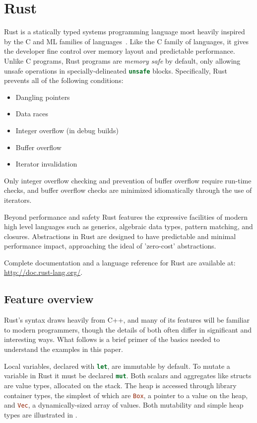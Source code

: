 
\section{Rust}
\label{sec:rust}

Rust is a statically typed systems programming language most heavily inspired by the C
and ML families of languages~\cite{RUST}.
Like the C family of languages, it gives the developer fine control over memory layout
and predictable performance.
Unlike C programs, Rust programs are \emph{memory safe} by default,
only allowing unsafe operations in specially-delineated \lstinline[language=Rust]{unsafe} blocks.
Specifically, Rust prevents all of the following conditions:
\begin{itemize}
\item Dangling pointers
\item Data races
\item Integer overflow (in debug builds)
\item Buffer overflow
\item Iterator invalidation
\end{itemize}
Only integer overflow checking and prevention of buffer overflow require run-time checks, and buffer overflow checks are minimized idiomatically through the use of iterators.

Beyond performance and safety Rust features the expressive facilities
of modern high level languages such as generics, algebraic data types,
pattern matching, and closures.
Abstractions in Rust are designed to have predictable and minimal
performance impact, approaching the ideal of 'zero-cost' abstractions.

Complete documentation and a language reference for Rust are available at: \url{http://doc.rust-lang.org/}.

\subsection{Feature overview}

Rust's syntax draws heavily from C++, and many of its features will be
familiar to modern programmers, though the details of both
often differ in significant and interesting ways.
What follows is a brief primer of the basics needed to understand the examples in this paper.

Local variables, declared with \lstinline[language=Rust]{let}, are immutable by default.
To mutate a variable in Rust it must be declared \lstinline[language=Rust]{mut}.
Both scalars and aggregates like structs are value types, allocated on the stack.
The heap is accessed through library container types, the simplest of which are \lstinline[language=Rust]{Box},
a pointer to a value on the heap, and \lstinline[language=Rust]{Vec}, a dynamically-sized
array of values. Both mutability and simple heap types are
illustrated in .

